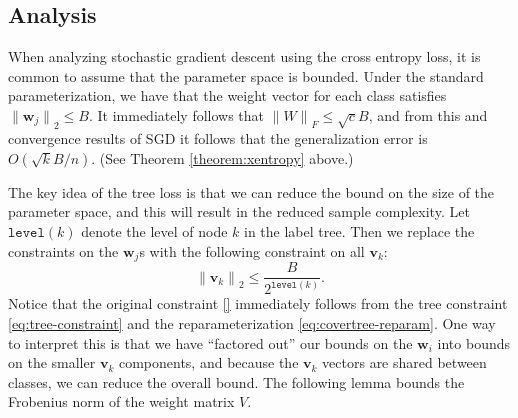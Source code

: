 \documentclass[10pt]{article}
\theoremstyle{definition}
\newcommand{\vv}{\mathbf v}
\newcommand{\w}{\mathbf w}
\newcommand{\ltwo}[1]{{\lVert {#1} \rVert}_2}
\newcommand{\lF}[1]{{\lVert {#1} \rVert}_F}
\newcommand{\level}[1]{\texttt{level}({#1})}
\begin{document}
\subsection{Analysis}

When analyzing stochastic gradient descent using the cross entropy loss,
it is common to assume that the parameter space is bounded.
Under the standard parameterization, we have that the weight vector for each class satisfies $\ltwo{\w_j} \le B$.
It immediately follows that $\lF{W} \le \sqrt{c}B$,
and from this and convergence results of SGD it follows that the generalization error is $O(\sqrt{k}B/n)$.
(See Theorem \ref{theorem:xentropy} above.)

The key idea of the tree loss is that we can reduce the bound on the size of the parameter space,
and this will result in the reduced sample complexity.
Let $\level k$ denote the level of node $k$ in the label tree.
Then we replace the constraints on the $\w_j$s with the following constraint on all $\vv_k$:
\begin{equation}
    \ltwo{\vv_k} \le \frac{B}{2^{\level k}}
    .
    \label{eq:tree-constraint}
\end{equation}
Notice that the original constraint \eqref{} immediately follows from the tree constraint \eqref{eq:tree-constraint} and the reparameterization \eqref{eq:covertree-reparam}.
One way to interpret this is that we have ``factored out'' our bounds on the $\w_i$ into bounds on the smaller $\vv_k$ components,
and because the $\vv_k$ vectors are shared between classes,
we can reduce the overall bound.
The following lemma bounds the Frobenius norm of the weight matrix $V$.
\end{document}
